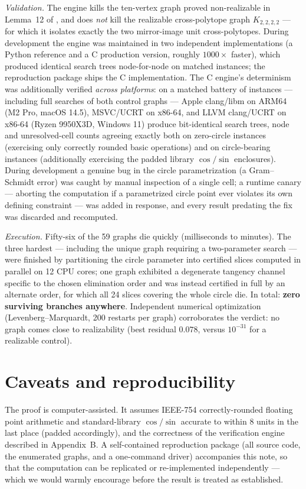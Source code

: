 \documentclass[11pt]{article}
\begin{document}
\emph{Validation.} The engine kills the ten-vertex graph proved non-realizable
in Lemma~12 of \cite{BPSSV}, and does \emph{not} kill the realizable
cross-polytope graph $K_{2,2,2,2}$ --- for which it isolates exactly the two
mirror-image unit cross-polytopes. During development the engine was
maintained in two independent implementations (a Python reference and a C
production version, roughly $1000\times$ faster), which produced identical
search trees node-for-node on matched instances; the reproduction package
ships the C implementation. The C engine's determinism was additionally
verified \emph{across platforms}: on a matched battery of instances ---
including full searches of both control graphs --- Apple clang/libm on ARM64
(M2 Pro, macOS 14.5), MSVC/UCRT on x86-64, and LLVM clang/UCRT on x86-64
(Ryzen 9950X3D, Windows 11) produce bit-identical search trees, node and
unresolved-cell counts agreeing exactly both on zero-circle instances
(exercising only correctly rounded basic operations) and on circle-bearing
instances (additionally exercising the padded library $\cos/\sin$
enclosures). During development a genuine bug in the circle
parametrization (a Gram--Schmidt error) was caught by manual inspection of a
single cell; a runtime canary --- aborting the computation if a parametrized
circle point ever violates its own defining constraint --- was added in
response, and every result predating the fix was discarded and recomputed.

\emph{Execution.} Fifty-six of the 59 graphs die quickly (milliseconds to
minutes). The three hardest --- including the unique graph requiring a
two-parameter search --- were finished by partitioning the circle parameter
into certified slices computed in parallel on 12 CPU cores; one graph exhibited
a degenerate tangency channel specific to the chosen elimination order and was
instead certified in full by an alternate order, for which all 24 slices
covering the whole circle die. In total: \textbf{zero surviving branches
anywhere}. Independent numerical optimization (Levenberg--Marquardt, 200
restarts per graph) corroborates the verdict: no graph comes close to
realizability (best residual $0.078$, versus $10^{-31}$ for a realizable
control).

\section*{Caveats and reproducibility}

The proof is computer-assisted. It assumes IEEE-754 correctly-rounded floating
point arithmetic and standard-library $\cos/\sin$ accurate to within 8 units in
the last place (padded accordingly), and the correctness of the verification
engine described in Appendix~B. A self-contained reproduction package (all
source code, the enumerated graphs, and a one-command driver) accompanies this
note, so that the computation can be replicated or re-implemented independently
--- which we would warmly encourage before the result is treated as
established.
\end{document}
